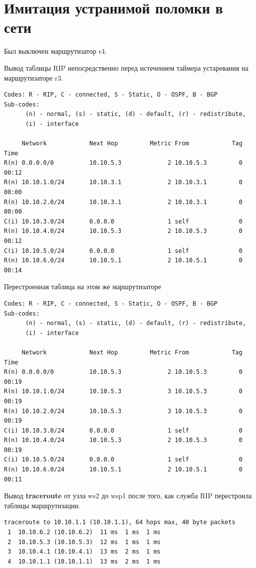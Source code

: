 \documentclass[a4paper,12pt]{article}
\begin{document}
\section{Имитация устранимой поломки в сети}

Был выключен маршрутизатор r4.

Вывод таблицы RIP непосредственно перед истечением таймера устаревания на маршрутизаторе r3.

\begin{Verbatim}
Codes: R - RIP, C - connected, S - Static, O - OSPF, B - BGP
Sub-codes:
      (n) - normal, (s) - static, (d) - default, (r) - redistribute,
      (i) - interface

     Network            Next Hop         Metric From            Tag Time
R(n) 0.0.0.0/0          10.10.5.3             2 10.10.5.3         0 00:12
R(n) 10.10.1.0/24       10.10.3.1             2 10.10.3.1         0 00:00
R(n) 10.10.2.0/24       10.10.3.1             2 10.10.3.1         0 00:00
C(i) 10.10.3.0/24       0.0.0.0               1 self              0
R(n) 10.10.4.0/24       10.10.5.3             2 10.10.5.3         0 00:12
C(i) 10.10.5.0/24       0.0.0.0               1 self              0
R(n) 10.10.6.0/24       10.10.5.1             2 10.10.5.1         0 00:14
\end{Verbatim}

Перестроенная таблица на этом же маршрутизаторе

\begin{Verbatim}
Codes: R - RIP, C - connected, S - Static, O - OSPF, B - BGP
Sub-codes:
      (n) - normal, (s) - static, (d) - default, (r) - redistribute,
      (i) - interface

     Network            Next Hop         Metric From            Tag Time
R(n) 0.0.0.0/0          10.10.5.3             2 10.10.5.3         0 00:19
R(n) 10.10.1.0/24       10.10.5.3             3 10.10.5.3         0 00:19
R(n) 10.10.2.0/24       10.10.5.3             3 10.10.5.3         0 00:19
C(i) 10.10.3.0/24       0.0.0.0               1 self              0
R(n) 10.10.4.0/24       10.10.5.3             2 10.10.5.3         0 00:19
C(i) 10.10.5.0/24       0.0.0.0               1 self              0
R(n) 10.10.6.0/24       10.10.5.1             2 10.10.5.1         0 00:11
\end{Verbatim}


Вывод \textbf{traceroute} от узла ws2 до wsp1 после того, как служба RIP перестроила таблицы маршрутизации.

\begin{Verbatim}
traceroute to 10.10.1.1 (10.10.1.1), 64 hops max, 40 byte packets
 1  10.10.6.2 (10.10.6.2)  11 ms  1 ms  1 ms
 2  10.10.5.3 (10.10.5.3)  12 ms  1 ms  1 ms
 3  10.10.4.1 (10.10.4.1)  13 ms  2 ms  1 ms
 4  10.10.1.1 (10.10.1.1)  13 ms  2 ms  1 ms
\end{Verbatim}
\end{document}
